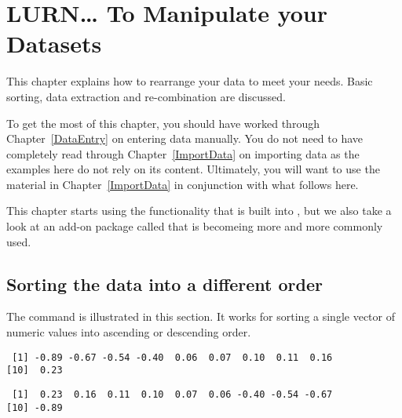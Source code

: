  
\chapter{LURN\ldots{} To Manipulate your Datasets} 
\label{Manipulate} 
 

 
This chapter explains how to rearrange your data to meet your needs. Basic sorting, data extraction and re-combination are discussed. 
 
To get the most of this chapter, you should have worked through Chapter~\ref{DataEntry} on entering data manually. You do not need to have completely read through Chapter~\ref{ImportData} on importing data as the examples here do not rely on its content. Ultimately, you will want to use the material in Chapter~\ref{ImportData} in conjunction with what follows here. 
 
 
This chapter starts using the functionality that is built into \R{}, but we also take a look at an add-on package called  that is becomeing more and more commonly used. 
 
\section{Sorting the data into a different order} 
 
The  command is illustrated in this section. It works for sorting a single vector of numeric values into ascending or descending order. 
\begin{knitrout}
\color{fgcolor}\begin{kframe}
\begin{alltt}
\hlstd{> }\hlkwb{=}\hlstd{(}\hlstd{(}\hlstd{),}\hlstd{)}
\hlstd{> }
\end{alltt}
\begin{verbatim}
 [1] -0.89 -0.67 -0.54 -0.40  0.06  0.07  0.10  0.11  0.16
[10]  0.23
\end{verbatim}
\begin{alltt}
\hlstd{> } \hlstd{=}\hlstd{)}
\end{alltt}
\begin{verbatim}
 [1]  0.23  0.16  0.11  0.10  0.07  0.06 -0.40 -0.54 -0.67
[10] -0.89
\end{verbatim}
\end{kframe}
\end{knitrout}
 
